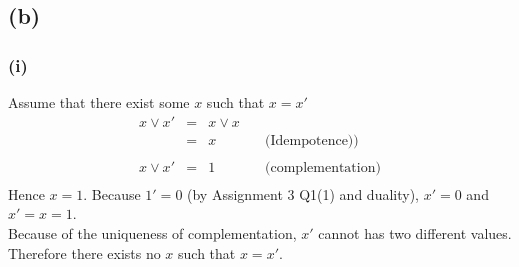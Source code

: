 \documentclass{article} %
\begin{document}
\subsection*{(b)}
\subsubsection*{(i)}
Assume that there exist some $x$ such that $x = x'$\\
\[\begin{array}{rllr}
    x \vee x'&=& x \vee x\\
                &=& x &\quad\mbox{(Idempotence))}\\
                \\
    x \vee x' &=& 1 &\quad\mbox{(complementation)}\\
\end{array}\]
Hence $x = 1$. Because $1' = 0$ (by Assignment 3 Q1(1) and duality), $x'=0$ and $x'=x=1$.\\
Because of the uniqueness of complementation, $x'$ cannot has two different values.\\
Therefore there exists no $x$ such that $x=x'$.
\end{document}
